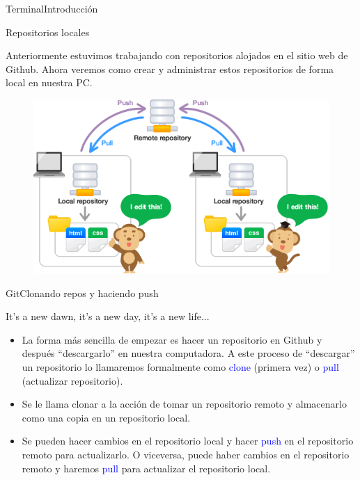 \documentclass[10pt]{beamer}
\begin{document}
\begin{frame}{Terminal}{Introducción}

\begin{block}{Repositorios locales}

Anteriormente estuvimos trabajando con repositorios alojados en el sitio web de Github. Ahora veremos como crear y administrar estos repositorios de forma local en nuestra PC.


\begin{figure}[h!]
\centering
\includegraphics [scale=0.35]{localremote}
\label{fig:localremote}
\end{figure}

\end{block}

\end{frame}

\begin{frame}{Git}{Clonando repos y haciendo push}

\begin{block}{It's a new dawn, it's a new day, it's a new life...}

\begin{itemize}
        \item La forma más sencilla de empezar es hacer un repositorio en Github y después ``descargarlo'' en nuestra computadora. A este proceso de ``descargar'' un repositorio lo llamaremos formalmente como \textcolor{blue}{clone} (primera vez) o \textcolor{blue}{pull} (actualizar repositorio).
        \item Se le llama clonar a la acción de tomar un repositorio remoto y almacenarlo como una copia en un repositorio local.
        \item Se pueden hacer cambios en el repositorio local y hacer \textcolor{blue}{push} en el repositorio remoto para actualizarlo. O viceversa, puede haber cambios en el repositorio remoto y haremos \textcolor{blue}{pull} para actualizar el repositorio local.
\end{itemize}

\end{block}

\end{frame}
\end{document}
